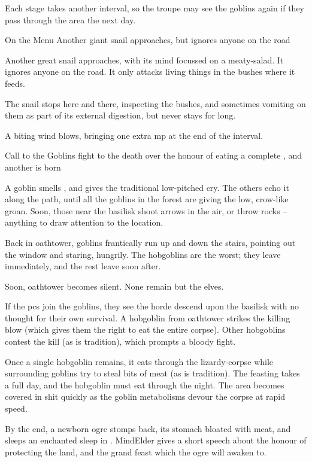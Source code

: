 Each stage takes another \gls{interval}, so the troupe may see the goblins again if they pass through the area the next day.

{On the Menu}%
{Another giant snail approaches, but ignores anyone on the road}%

Another great snail approaches, with its mind focussed on a meaty-salad.
It ignores anyone on the road.
It only attacks living things in the bushes where it feeds.

The snail stops here and there, inspecting the bushes, and sometimes vomiting on them as part of its external digestion, but never stays for long.

A biting wind blows, bringing one extra \gls{mp} at the end of the \gls{interval}.

{Call to the }%
{Goblins fight to the death over the honour of eating a complete , and another  is born}%

A goblin smells , and gives the traditional low-pitched cry.
The others echo it along the path, until all the goblins in the forest are giving the low, crow-like groan.
Soon, those near the \gls{basilisk} shoot arrows in the air, or throw rocks -- anything to draw attention to the location.

Back in \gls{oathtower}, goblins frantically run up and down the stairs, pointing out the window and staring, hungrily.
The hobgoblins are the worst; they leave immediately, and the rest leave soon after.

Soon, \gls{oathtower} becomes silent.
None remain but the elves.

If the \glspl{pc} join the goblins, they see the horde descend upon the \gls{basilisk} with no thought for their own survival.
A hobgoblin from \gls{oathtower} strikes the killing blow (which gives them the right to eat the entire corpse).
Other hobgoblins contest the kill (as is tradition), which prompts a bloody fight.

Once a single hobgoblin remains, it eats through the lizardy-corpse while surrounding goblins try to steal bits of meat (as is tradition).
The feasting takes a full day, and the hobgoblin must eat through the night.
The area becomes covered in shit quickly as the goblin metabolisms devour the corpse at rapid speed.

By the end, a newborn \gls{ogre} stomps back, its stomach bloated with meat, and sleeps an enchanted sleep in .
\Gls{MindElder} gives a short speech about the honour of protecting the land, and the grand feast which the \gls{ogre} will awaken to.

